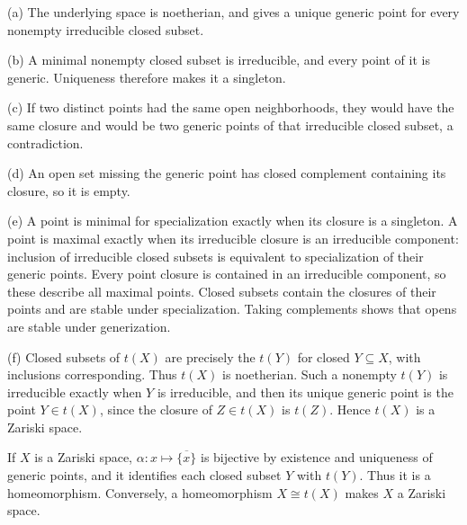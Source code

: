(a) The underlying space is noetherian, and  gives a unique generic point for every nonempty irreducible closed subset.

(b) A minimal nonempty closed subset is irreducible, and every point of it is generic. Uniqueness therefore makes it a singleton.

(c) If two distinct points had the same open neighborhoods, they would have the same closure and would be two generic points of that irreducible closed subset, a contradiction.

(d) An open set missing the generic point has closed complement containing its closure, so it is empty.

(e) A point is minimal for specialization exactly when its closure is a singleton. A point is maximal exactly when its irreducible closure is an irreducible component: inclusion of irreducible closed subsets is equivalent to specialization of their generic points. Every point closure is contained in an irreducible component, so these describe all maximal points. Closed subsets contain the closures of their points and are stable under specialization. Taking complements shows that opens are stable under generization.

(f) Closed subsets of $t(X)$ are precisely the $t(Y)$ for closed $Y\subseteq X$, with inclusions corresponding. Thus $t(X)$ is noetherian. Such a nonempty $t(Y)$ is irreducible exactly when $Y$ is irreducible, and then its unique generic point is the point $Y\in t(X)$, since the closure of $Z\in t(X)$ is $t(Z)$. Hence $t(X)$ is a Zariski space.

If $X$ is a Zariski space, $\alpha:x\mapsto\overline{\{x\}}$ is bijective by existence and uniqueness of generic points, and it identifies each closed subset $Y$ with $t(Y)$. Thus it is a homeomorphism. Conversely, a homeomorphism $X\cong t(X)$ makes $X$ a Zariski space.
